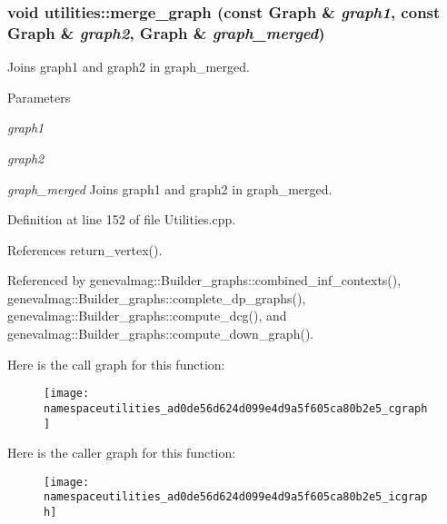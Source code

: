 \hypertarget{namespaceutilities_ad0de56d624d099e4d9a5f605ca80b2e5}{
\subsubsection[{merge\_\-graph}]{\setlength{\rightskip}{0pt plus 5cm}void utilities::merge\_\-graph (const Graph \& {\em graph1}, \/  const Graph \& {\em graph2}, \/  Graph \& {\em graph\_\-merged})}}
\label{namespaceutilities_ad0de56d624d099e4d9a5f605ca80b2e5}
Joins graph1 and graph2 in graph\_\-merged. 
\begin{DoxyParams}{Parameters}
\item[{\em graph1}]\item[{\em graph2}]\item[{\em graph\_\-merged}]Joins graph1 and graph2 in graph\_\-merged. \end{DoxyParams}


Definition at line 152 of file Utilities.cpp.



References return\_\-vertex().



Referenced by genevalmag::Builder\_\-graphs::combined\_\-inf\_\-contexts(), genevalmag::Builder\_\-graphs::complete\_\-dp\_\-graphs(), genevalmag::Builder\_\-graphs::compute\_\-dcg(), and genevalmag::Builder\_\-graphs::compute\_\-down\_\-graph().



Here is the call graph for this function:\nopagebreak
\begin{figure}[H]
\begin{center}
\leavevmode
\texttt{[image: namespaceutilities\_ad0de56d624d099e4d9a5f605ca80b2e5\_cgraph]}
\end{center}
\end{figure}




Here is the caller graph for this function:\nopagebreak
\begin{figure}[H]
\begin{center}
\leavevmode
\texttt{[image: namespaceutilities\_ad0de56d624d099e4d9a5f605ca80b2e5\_icgraph]}
\end{center}
\end{figure}


